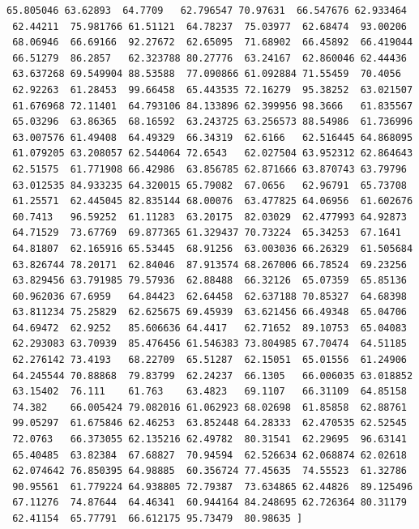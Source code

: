 \documentclass[11pt]{article}
\begin{document}
\begin{Verbatim}[commandchars=\\\{\}]
 65.805046 63.62893  64.7709   62.796547 70.97631  66.547676 62.933464
 62.44211  75.981766 61.51121  64.78237  75.03977  62.68474  93.00206
 68.06946  66.69166  92.27672  62.65095  71.68902  66.45892  66.419044
 66.51279  86.2857   62.323788 80.27776  63.24167  62.860046 62.44436
 63.637268 69.549904 88.53588  77.090866 61.092884 71.55459  70.4056
 62.92263  61.28453  99.66458  65.443535 72.16279  95.38252  63.021507
 61.676968 72.11401  64.793106 84.133896 62.399956 98.3666   61.835567
 65.03296  63.86365  68.16592  63.243725 63.256573 88.54986  61.736996
 63.007576 61.49408  64.49329  66.34319  62.6166   62.516445 64.868095
 61.079205 63.208057 62.544064 72.6543   62.027504 63.952312 62.864643
 62.51575  61.771908 66.42986  63.856785 62.871666 63.870743 63.79796
 63.012535 84.933235 64.320015 65.79082  67.0656   62.96791  65.73708
 61.25571  62.445045 82.835144 68.00076  63.477825 64.06956  61.602676
 60.7413   96.59252  61.11283  63.20175  82.03029  62.477993 64.92873
 64.71529  73.67769  69.877365 61.329437 70.73224  65.34253  67.1641
 64.81807  62.165916 65.53445  68.91256  63.003036 66.26329  61.505684
 63.826744 78.20171  62.84046  87.913574 68.267006 66.78524  69.23256
 63.829456 63.791985 79.57936  62.88488  66.32126  65.07359  65.85136
 60.962036 67.6959   64.84423  62.64458  62.637188 70.85327  64.68398
 63.811234 75.25829  62.625675 69.45939  63.621456 66.49348  65.04706
 64.69472  62.9252   85.606636 64.4417   62.71652  89.10753  65.04083
 62.293083 63.70939  85.476456 61.546383 73.804985 67.70474  64.51185
 62.276142 73.4193   68.22709  65.51287  62.15051  65.01556  61.24906
 64.245544 70.88868  79.83799  62.24237  66.1305   66.006035 63.018852
 63.15402  76.111    61.763    63.4823   69.1107   66.31109  64.85158
 74.382    66.005424 79.082016 61.062923 68.02698  61.85858  62.88761
 99.05297  61.675846 62.46253  63.852448 64.28333  62.470535 62.52545
 72.0763   66.373055 62.135216 62.49782  80.31541  62.29695  96.63141
 65.40485  63.82384  67.68827  70.94594  62.526634 62.068874 62.02618
 62.074642 76.850395 64.98885  60.356724 77.45635  74.55523  61.32786
 90.95561  61.779224 64.938805 72.79387  73.634865 62.44826  89.125496
 67.11276  74.87644  64.46341  60.944164 84.248695 62.726364 80.31179
 62.41154  65.77791  66.612175 95.73479  80.98635 ]

    \end{Verbatim}
\end{document}
